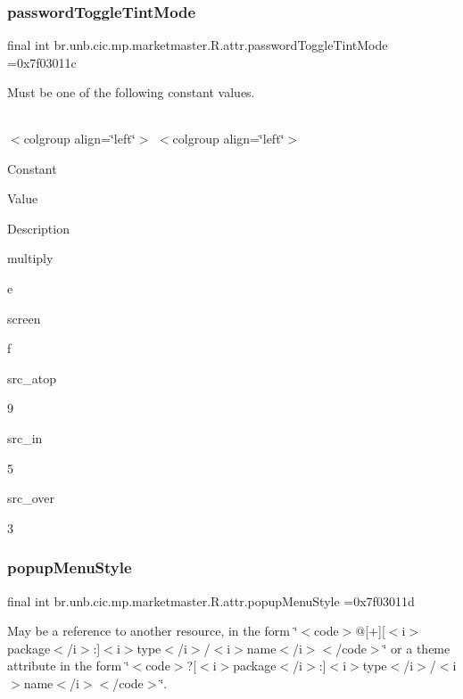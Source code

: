 \subsubsection{\texorpdfstring{password\+Toggle\+Tint\+Mode}{passwordToggleTintMode}}
{\footnotesize\ttfamily final int br.\+unb.\+cic.\+mp.\+marketmaster.\+R.\+attr.\+password\+Toggle\+Tint\+Mode =0x7f03011c\hspace{0.3cm}{\ttfamily [static]}}

Must be one of the following constant values.

\tabulinesep=1mm
\begin{longtabu} spread 0pt [c]{*{0}{|X[-1]}|}
\hline
\end{longtabu}
$<$colgroup align=\char`\"{}left\char`\"{}$>$ $<$colgroup align=\char`\"{}left\char`\"{}$>$ 

Constant

Value

Description 

multiply

e

screen

f

src\+\_\+atop

9

src\+\_\+in

5

src\+\_\+over

3\mbox{\label{classbr_1_1unb_1_1cic_1_1mp_1_1marketmaster_1_1R_1_1attr_a6272a79d38aba49fd3f0c25dca129e16}} 
\subsubsection{\texorpdfstring{popup\+Menu\+Style}{popupMenuStyle}}
{\footnotesize\ttfamily final int br.\+unb.\+cic.\+mp.\+marketmaster.\+R.\+attr.\+popup\+Menu\+Style =0x7f03011d\hspace{0.3cm}{\ttfamily [static]}}

May be a reference to another resource, in the form \char`\"{}$<$code$>$@\mbox{[}+\mbox{]}\mbox{[}$<$i$>$package$<$/i$>$\+:\mbox{]}$<$i$>$type$<$/i$>$/$<$i$>$name$<$/i$>$$<$/code$>$\char`\"{} or a theme attribute in the form \char`\"{}$<$code$>$?\mbox{[}$<$i$>$package$<$/i$>$\+:\mbox{]}$<$i$>$type$<$/i$>$/$<$i$>$name$<$/i$>$$<$/code$>$\char`\"{}. \mbox{\label{classbr_1_1unb_1_1cic_1_1mp_1_1marketmaster_1_1R_1_1attr_a49361846cb268f17bf7bf3808f343843}} 
